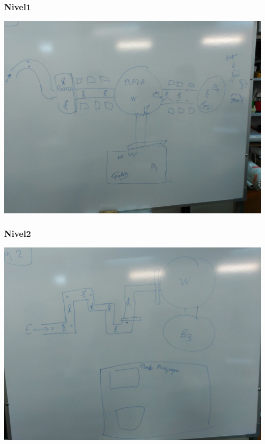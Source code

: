 \documentclass[11pt, twoside]{article}
\begin{document}
\subsubsection{Nivel1}
\includegraphics[width=16cm]{./images/Level1.jpg}

\subsubsection{Nivel2}
\includegraphics[width=16cm]{./images/Level2.jpg}
\end{document}

